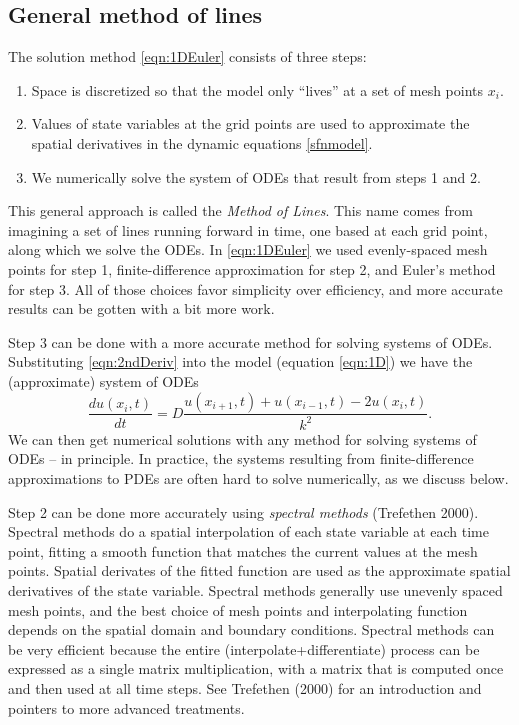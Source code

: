 \documentclass [11pt]{article}
\numberwithin{exercise}{section}
\begin{document}
\subsection{General method of lines} 
The solution method \eqref{eqn:1DEuler} consists of three steps:
\begin{enumerate}
\item Space is discretized so that the model only ``lives'' at a set of mesh points $x_i$.
\item Values of state variables at the grid points are used to approximate the spatial derivatives 
in the dynamic equations \eqref{sfnmodel}. 
\item We numerically solve the system of ODEs that result from steps 1 and 2. 
\end{enumerate}
This general approach is called the \textit{Method of Lines}. This name comes from imagining a set of lines
running forward in time, one based at each grid point, along which we solve the ODEs. 
In \eqref{eqn:1DEuler} we used evenly-spaced mesh points for step 1, finite-difference approximation 
for step 2, and Euler's method for step 3. All of those choices favor simplicity over efficiency, and more 
accurate results can be gotten with a bit more work. 

Step 3 can be done with a more accurate method for solving systems of ODEs. 
Substituting \eqref{eqn:2ndDeriv} into the model (equation \eqref{eqn:1D}) we have the (approximate) system
of ODEs 
\begin{equation} 
\frac{d u(x_i,t)}{dt} = D   \frac{u(x_{i+1},t) + u(x_{i-1},t) - 2u(x_i,t)}{k^2}.
\label{eqn:1DLines}
\end{equation}
We can then get numerical solutions with any method for solving systems of ODEs -- in principle. In practice, the
systems resulting from finite-difference approximations to PDEs are often hard to solve numerically, as we discuss below. 

Step 2 can be done more accurately using \textit{spectral methods} (Trefethen 2000).
Spectral methods do a spatial interpolation of each state variable at each time point, fitting a smooth function that 
matches the current values at the mesh points. Spatial derivates of the fitted function are 
used as the approximate spatial derivatives of the state variable. Spectral
methods generally use unevenly spaced mesh points, and the best choice of mesh points and 
interpolating function depends on the spatial domain and boundary conditions. Spectral methods can be very
efficient because the entire {(interpolate+differentiate)} process can be expressed as a single
matrix multiplication, with a matrix that is computed once and then used at all time steps. 
See Trefethen (2000) for an introduction and pointers to more advanced treatments.  
\end{document}
